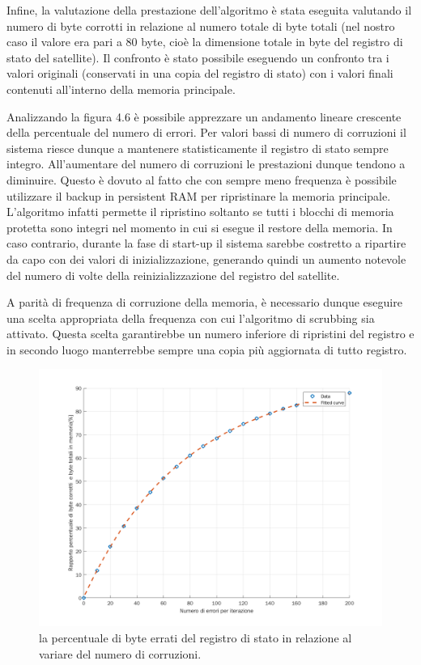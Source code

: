 \documentclass[LaM,binding=0.6cm]{../sapthesis}
\begin{document}
Infine, la valutazione della prestazione dell'algoritmo è stata eseguita valutando il numero di byte corrotti in relazione al numero totale di byte totali (nel nostro caso il valore era pari a 80 byte, cioè la dimensione totale in byte del registro di stato del satellite). 
Il confronto è stato possibile eseguendo un confronto tra i valori originali (conservati in una copia del registro di stato) con i valori finali contenuti all'interno della memoria principale.

\newpage

Analizzando la figura 4.6 è possibile apprezzare un andamento lineare crescente della percentuale del numero di errori. Per valori bassi di numero di corruzioni il sistema riesce dunque a mantenere statisticamente il registro di stato sempre integro. All'aumentare del numero di corruzioni le prestazioni dunque tendono a diminuire. Questo è dovuto al fatto che con sempre meno frequenza è possibile utilizzare il backup in persistent RAM per ripristinare la memoria principale. L'algoritmo infatti permette il ripristino soltanto se tutti i blocchi di memoria protetta sono integri nel momento in cui si esegue il restore della memoria. In caso contrario, durante la fase di start-up il sistema sarebbe costretto a ripartire da capo con dei valori di inizializzazione, generando quindi un aumento notevole del numero di volte della reinizializzazione del registro del satellite. 

A parità di frequenza di corruzione della memoria, è necessario dunque eseguire una scelta appropriata della frequenza con cui l'algoritmo di scrubbing sia attivato. Questa scelta garantirebbe un numero inferiore di ripristini del registro e in secondo luogo manterrebbe sempre una copia più aggiornata di tutto registro.

\begin{figure}[htbp]
\centerline{\includegraphics[scale=0.7]{examples/scrubbingTestParziali.png}}
\caption{la percentuale di byte errati del registro di stato in relazione al variare del numero di corruzioni.}
\label{fig}
\end{figure}
\vspace{0.5cm}
\newpage
\end{document}
